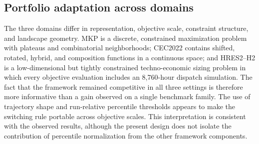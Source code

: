 \begin{table}[htbp]
\centering
\caption{Cross-domain interpretation of the principal empirical findings.}
\label{tab:discussion-synthesis}
\small
{}
\end{table}

\subsection{Portfolio adaptation across domains}
\label{sec:discussion-cross-domain}

The three domains differ in representation, objective scale, constraint
structure, and landscape geometry. MKP is a discrete, constrained maximization
problem with plateaus and combinatorial neighborhoods; CEC2022 contains shifted,
rotated, hybrid, and composition functions in a continuous space; and HRES2--H2
is a low-dimensional but tightly constrained techno-economic sizing problem in
which every objective evaluation includes an 8,760-hour dispatch simulation.
The fact that the framework remained competitive in all three settings is
therefore more informative than a gain observed on a single benchmark family.
The use of trajectory shape and run-relative percentile thresholds appears to
make the switching rule portable across objective scales. This interpretation
is consistent with the observed results, although the present design does not
isolate the contribution of percentile normalization from the other framework
components.

